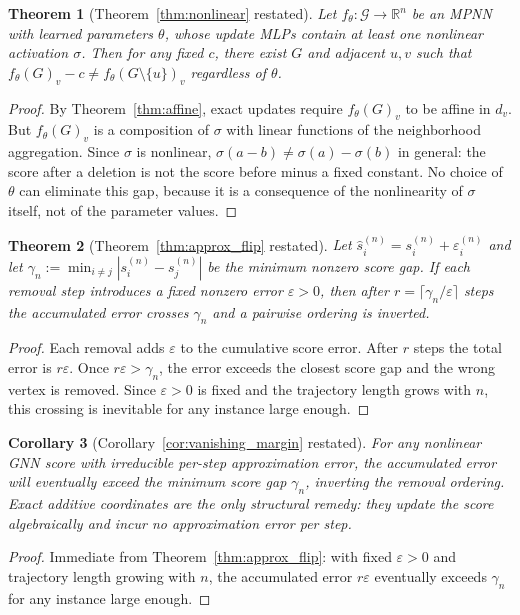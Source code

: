 \documentclass[11pt]{article}
\theoremstyle{plain}
\newtheorem{theorem}{Theorem}[section]
\newtheorem{corollary}[theorem]{Corollary}
\theoremstyle{remark}
\begin{document}
\begin{theorem}[Theorem~\ref{thm:nonlinear} restated]
  Let $f_\theta\colon\mathcal{G}\to\mathbb{R}^n$ be an MPNN with learned parameters
  $\theta$, whose update MLPs contain at least one nonlinear activation $\sigma$.
  Then for any fixed $c$, there exist $G$ and adjacent $u,v$ such that
  $f_\theta(G)_v - c \neq f_\theta(G\setminus\{u\})_v$ regardless of $\theta$.
\end{theorem}
\begin{proof}
  By Theorem~\ref{thm:affine}, exact updates require $f_\theta(G)_v$ to be affine
  in $d_v$. But $f_\theta(G)_v$ is a composition of $\sigma$ with linear functions
  of the neighborhood aggregation. Since $\sigma$ is nonlinear,
  $\sigma(a - b) \neq \sigma(a) - \sigma(b)$ in general: the score after a deletion
  is not the score before minus a fixed constant. No choice of $\theta$ can
  eliminate this gap, because it is a consequence of the nonlinearity of $\sigma$
  itself, not of the parameter values.
\end{proof}

\begin{theorem}[Theorem~\ref{thm:approx_flip} restated]
  Let $\hat{s}_i^{(n)} = s_i^{(n)} + \varepsilon_i^{(n)}$ and let $\gamma_n :=
  \min_{i\neq j}|s_i^{(n)} - s_j^{(n)}|$ be the minimum nonzero score gap. If
  each removal step introduces a fixed nonzero error $\varepsilon > 0$, then after
  $r = \lceil \gamma_n / \varepsilon \rceil$ steps the accumulated error crosses
  $\gamma_n$ and a pairwise ordering is inverted.
\end{theorem}
\begin{proof}
  Each removal adds $\varepsilon$ to the cumulative score error. After $r$ steps
  the total error is $r\varepsilon$. Once $r\varepsilon > \gamma_n$, the error
  exceeds the closest score gap and the wrong vertex is removed. Since $\varepsilon
  > 0$ is fixed and the trajectory length grows with $n$, this crossing is
  inevitable for any instance large enough.
\end{proof}

\begin{corollary}[Corollary~\ref{cor:vanishing_margin} restated]
  For any nonlinear GNN score with irreducible per-step approximation error,
  the accumulated error will eventually exceed the minimum score gap $\gamma_n$,
  inverting the removal ordering. Exact additive coordinates are the only
  structural remedy: they update the score algebraically and incur no approximation
  error per step.
\end{corollary}
\begin{proof}
  Immediate from Theorem~\ref{thm:approx_flip}: with fixed $\varepsilon > 0$ and
  trajectory length growing with $n$, the accumulated error $r\varepsilon$
  eventually exceeds $\gamma_n$ for any instance large enough.
\end{proof}
\end{document}
